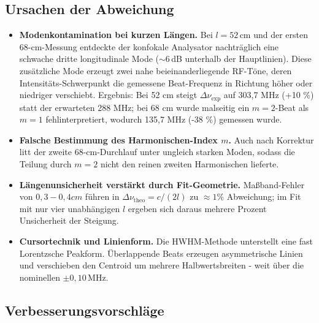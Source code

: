 \subsection*{Ursachen der Abweichung}

\begin{itemize}
  \item \textbf{Modenkontamination bei kurzen Längen.}  
    Bei \(l=52\,\mathrm{cm}\) und der ersten 68-cm-Messung entdeckte der konfokale Analysator nachträglich eine schwache dritte longitudinale Mode (\(\sim\!6\)\,dB unterhalb der Hauptlinien). Diese zusätzliche Mode erzeugt zwei nahe beieinanderliegende RF-Töne, deren Intensitäts-Schwerpunkt die gemessene Beat-Frequenz in Richtung höher oder niedriger verschiebt. Ergebnis: Bei 52 cm steigt \(\Delta\nu_{\mathrm{exp}}\) auf 303,7 MHz (+10 \%) statt der erwarteten 288 MHz; bei 68 cm wurde malseitig ein \(m=2\)-Beat als \(m=1\) fehlinterpretiert, wodurch 135,7 MHz (-38 \%) gemessen wurde.

  \item \textbf{Falsche Bestimmung des Harmonischen-Index \(m\).}  
    Auch nach Korrektur litt der zweite 68-cm-Durchlauf unter ungleich starken Moden, sodass die Teilung durch \(m=2\) nicht den reinen zweiten Harmonischen lieferte.

  \item \textbf{Längenunsicherheit verstärkt durch Fit-Geometrie.}  
    Maßband-Fehler von $0{,}3-0{,}4 cm$ führen in $\Delta\nu_{\mathrm{theo}}=c/(2l)$ zu $\approx 1 \%$ Abweichung; im Fit mit nur vier unabhängigen $l$ ergeben sich daraus mehrere Prozent Unsicherheit der Steigung.

  \item \textbf{Cursortechnik und Linienform.}  
    Die HWHM-Methode unterstellt eine fast Lorentzsche Peakform. Überlappende Beats erzeugen asymmetrische Linien und verschieben den Centroid um mehrere Halbwertsbreiten - weit über die nominellen \(\pm0{,}10\)\,MHz.
\end{itemize}

\subsection*{Verbesserungsvorschläge}

